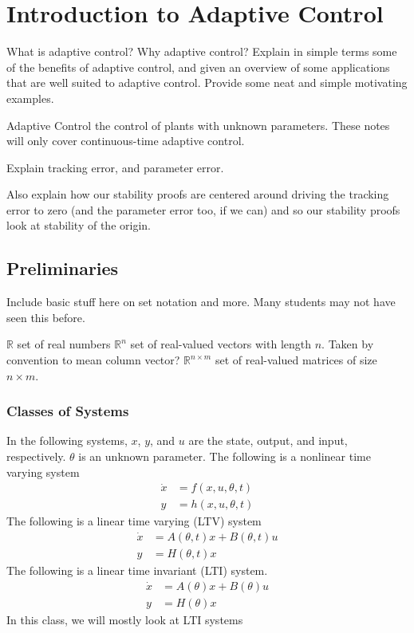 \chapter{Introduction to Adaptive Control}

What is adaptive control? Why adaptive control?
Explain in simple terms some of the benefits of adaptive control, and given an overview of some applications that are well suited to adaptive control.
Provide some neat and simple motivating examples.

Adaptive Control \textemdash{} the control of plants with unknown parameters.
These notes will only cover continuous-time adaptive control.

Explain tracking error, and parameter error.

Also explain how our stability proofs are centered around driving the tracking error to zero (and the parameter error too, if we can) and so our stability proofs look at stability of the origin.

\section{Preliminaries}

Include basic stuff here on set notation and more.
Many students may not have seen this before.

$\mathbb{R}$ set of real numbers
$\mathbb{R}^{n}$ set of real-valued vectors with length $n$.
Taken by convention to mean column vector?
$\mathbb{R}^{n\times m}$ set of real-valued matrices of size $n\times m$.

\subsection{Classes of Systems}

In the following systems, $x$, $y$, and $u$ are the state, output, and input, respectively.
$\theta$ is an unknown parameter.
The following is a nonlinear time varying system
\begin{align*}
  \dot{x}&=f(x,u,\theta,t) \\
  y&=h(x,u,\theta,t)
\end{align*}
The following is a linear time varying (LTV) system
\begin{align*}
  \dot{x}&=A(\theta,t)x+B(\theta,t)u \\
  y&=H(\theta,t)x
\end{align*}
The following is a linear time invariant (LTI) system.
\begin{align*}
  \dot{x}&=A(\theta)x+B(\theta)u \\
  y&=H(\theta)x
\end{align*}
In this class, we will mostly look at LTI systems

